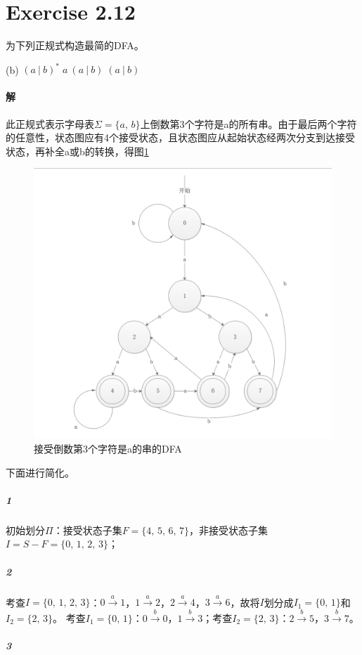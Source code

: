\documentclass{article}
\begin{document}
\section{Exercise 2.12}
为下列正规式构造最简的DFA。\par
(b) $(a\ |\ b)^*\;a\ (a\ |\ b)\;(a\ |\ b)$
\\

\paragraph{解}
此正规式表示字母表$\Sigma=\{a,\,b\}$上倒数第3个字符是a的所有串。由于最后两个字符的任意性，状态图应有4个接受状态，且状态图应从起始状态经两次分支到达接受状态，再补全a或b的转换，得图\ref{fig:2}\par
\begin{figure}
\centering
\includegraphics[scale=0.6]{DFA2.png}
\caption{\label{fig:2}接受倒数第3个字符是a的串的DFA}

\end{figure}
下面进行简化。
\subparagraph{1}
初始划分$\Pi$：接受状态子集$F=\{4,\,5,\,6,\,7\}$，非接受状态子集$I=S-F=\{0,\,1,\,2,\,3\}$；
\subparagraph{2}
考查$I=\{0,\,1,\,2,\,3\}$：$0 \xrightarrow{a} 1$，$1 \xrightarrow{a} 2$，$2 \xrightarrow{a} 4$，$3 \xrightarrow{a} 6$，故将$I$划分成$I_1=\{0,\,1\}$和$I_2=\{2,\,3\}$。
考查$I_1=\{0,\,1\}$：$0 \xrightarrow{b} 0$，$1 \xrightarrow{b} 3$；考查$I_2=\{2,\,3\}$：$2 \xrightarrow{b} 5$，$3 \xrightarrow{b} 7$。
\subparagraph{3}
\end{document}
